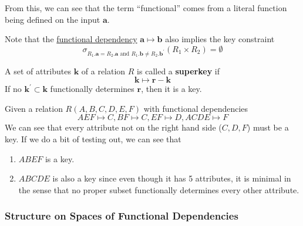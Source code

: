     From this, we can see that the term ``functional'' comes from a literal function being defined on the input $\mathbf{a}$. 

    \begin{lemma}
      \label{thm:fds-as-key-constraints}
      Note that the \hyperref[def:functional-dependency]{functional dependency} $\mathbf{a} \mapsto \mathbf{b}$ also implies the key constraint 
      \begin{equation}
        \sigma_{R_1.\mathbf{a} = R_2.\mathbf{a} \text{ and } R_1.\mathbf{b} \neq R_2.\mathbf{b}^\prime} (R_1 \times R_2) = \emptyset
      \end{equation}
    \end{lemma}

    \begin{definition}[Superkey]
      \label{def:superkey}
      A set of attributes $\mathbf{k}$ of a relation $R$ is called a \textbf{superkey} if 
      \begin{equation}
        \mathbf{k} \mapsto \mathbf{r} - \mathbf{k}
      \end{equation}
      If no $\mathbf{k}^\prime \subset \mathbf{k}$ functionally determines $\mathbf{r}$, then it is a key. 
    \end{definition}
    
    \begin{example}
      \label{ex:clarification-of-minimal-meaning}
      Given a relation $R(A, B, C, D, E, F)$ with functional dependencies 
      \begin{equation}
        AEF \mapsto C, BF \mapsto C, EF \mapsto D, ACDE \mapsto F
      \end{equation}
      We can see that every attribute not on the right hand side ($C, D, F$) must be a key. If we do a bit of testing out, we can see that 
      \begin{enumerate}
        \item $ABEF$ is a key. 
        \item $ABCDE$ is also a key since even though it has 5 attributes, it is minimal in the sense that no proper subset functionally determines every other attribute.   
      \end{enumerate}
    \end{example}

  \subsubsection{Structure on Spaces of Functional Dependencies}

